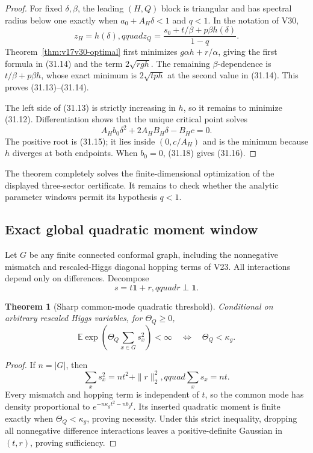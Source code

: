 \documentclass[11pt]{article}
\newtheorem{theorem}{Theorem}[section]
\theoremstyle{remark}
\begin{document}
\begin{proof}
For fixed \(\delta,\beta\), the leading \((H,Q)\) block is triangular
and has spectral radius below one exactly when
\(a_0+A_H\delta<1\) and \(q<1\).  In the notation of V30,
\[
 z_H=h(\delta),qquad
 z_Q=\frac{s_0+t/\beta+p\beta h(\delta)}{1-q}.     \tag{31.17}
\]
Theorem~\ref{thm:v17v30-optimal} first minimizes
\(g\alpha h+r/\alpha\), giving the first formula in (31.14) and the
term \(2\sqrt{rgh}\).  The remaining \(\beta\)-dependence is
\(t/\beta+p\beta h\), whose exact minimum is
\(2\sqrt{tph}\) at the second value in (31.14).  This proves
(31.13)--(31.14).

The left side of (31.13) is strictly increasing in \(h\), so it remains
to minimize (31.12).  Differentiation shows that the unique critical
point solves
\[
 A_Hb_0\delta^2+2A_HB_H\delta-B_Hc=0.              \tag{31.18}
\]
The positive root is (31.15); it lies inside
\((0,c/A_H)\) and is the minimum because \(h\) diverges at both
endpoints.  When \(b_0=0\), (31.18) gives (31.16).
\end{proof}

The theorem completely solves the finite-dimensional optimization of
the displayed three-sector certificate.  It remains to check whether
the analytic parameter windows permit its hypothesis \(q<1\).

\subsection{Exact global quadratic moment window}

Let \(G\) be any finite connected conformal graph, including the
nonnegative mismatch and rescaled-Higgs diagonal hopping terms of
V23.  All interactions depend only on differences.  Decompose
\[
 s=t\mathbf1+r,qquad r\perp\mathbf1.              \tag{31.19}
\]

\begin{theorem}[Sharp common-mode quadratic threshold]
\label{thm:v17v31-qwindow}
Conditional on arbitrary rescaled Higgs variables, for
\(\Theta_Q\geq0\),
\[
 \mathbb E\exp\left(
 \Theta_Q\sum_{x\in G}s_x^2\right)<\infty
 \quad\Longleftrightarrow\quad
 \Theta_Q<\kappa_g.                               \tag{31.20}
\]
\end{theorem}

\begin{proof}
If \(n=|G|\), then
\[
 \sum_xs_x^2=nt^2+\|r\|_2^2,qquad
 \sum_xs_x=nt.                                    \tag{31.21}
\]
Every mismatch and hopping term is independent of \(t\), so the common
mode has density proportional to
\(e^{-n\kappa_gt^2-nb_gt}\).  Its inserted quadratic moment is finite
exactly when \(\Theta_Q<\kappa_g\), proving necessity.  Under this
strict inequality, dropping all nonnegative difference interactions
leaves a positive-definite Gaussian in \((t,r)\), proving sufficiency.
\end{proof}
\end{document}
